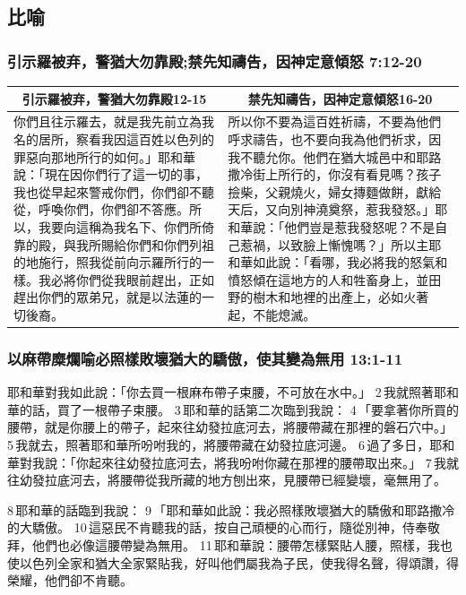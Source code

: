 \subsection{比喻}
\subsubsection{引示羅被弃，警猶大勿靠殿;禁先知禱告，因神定意傾怒 7:12-20}
\begin{table}[H]
\centering
\begin{tabular}{p{8.25cm}|p{8.750cm}}\hline\hline
\multicolumn{1}{c|}{引示羅被弃，警猶大勿靠殿12-15}&\multicolumn{1}{c}{禁先知禱告，因神定意傾怒16-20}\\\hline
你們且往示羅去，就是我先前立為我名的居所，察看我因這百姓以色列的罪惡向那地所行的如何。」耶和華說：「現在因你們行了這一切的事，我也從早起來警戒你們，你們卻不聽從，呼喚你們，你們卻不答應。所以，我要向這稱為我名下、你們所倚靠的殿，與我所賜給你們和你們列祖的地施行，照我從前向示羅所行的一樣。我必將你們從我眼前趕出，正如趕出你們的眾弟兄，就是以法蓮的一切後裔。
&所以你不要為這百姓祈禱，不要為他們呼求禱告，也不要向我為他們祈求，因我不聽允你。他們在猶大城邑中和耶路撒冷街上所行的，你沒有看見嗎？孩子撿柴，父親燒火，婦女摶麵做餅，獻給天后，又向別神澆奠祭，惹我發怒。」耶和華說：「他們豈是惹我發怒呢？不是自己惹禍，以致臉上慚愧嗎？」所以主耶和華如此說：「看哪，我必將我的怒氣和憤怒傾在這地方的人和牲畜身上，並田野的樹木和地裡的出產上，必如火著起，不能熄滅。\\\hline
\end{tabular}
\end{table}

\subsubsection{以麻帶糜爛喻必照樣敗壞猶大的驕傲，使其變為無用 13:1-11}
耶和華對我如此說：「你去買一根麻布帶子束腰，不可放在水中。」 2 我就照著耶和華的話，買了一根帶子束腰。 3 耶和華的話第二次臨到我說： 4 「要拿著你所買的腰帶，就是你腰上的帶子，起來往幼發拉底河去，將腰帶藏在那裡的磐石穴中。」 5 我就去，照著耶和華所吩咐我的，將腰帶藏在幼發拉底河邊。 6 過了多日，耶和華對我說：「你起來往幼發拉底河去，將我吩咐你藏在那裡的腰帶取出來。」 7 我就往幼發拉底河去，將腰帶從我所藏的地方刨出來，見腰帶已經變壞，毫無用了。

8 耶和華的話臨到我說： 9 「耶和華如此說：我必照樣敗壞猶大的驕傲和耶路撒冷的大驕傲。 10 這惡民不肯聽我的話，按自己頑梗的心而行，隨從別神，侍奉敬拜，他們也必像這腰帶變為無用。 11 耶和華說：腰帶怎樣緊貼人腰，照樣，我也使以色列全家和猶大全家緊貼我，好叫他們屬我為子民，使我得名聲，得頌讚，得榮耀，他們卻不肯聽。

